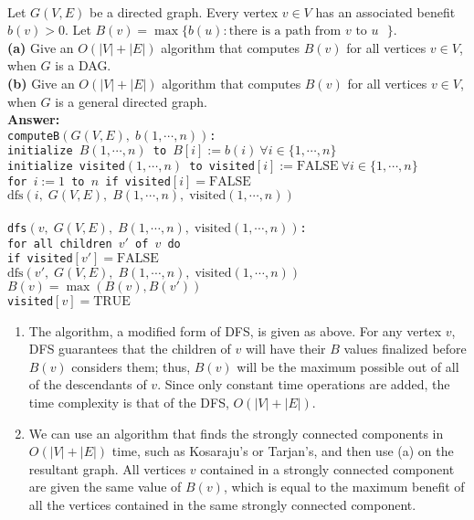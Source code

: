 \documentclass[a4paper,11pt]{article}
\begin{document}
\bigskip

\\
Let $G(V,E)$ be a directed graph. Every vertex $v\in V$  has an associated benefit $b(v) > 0$.
Let $B(v) = \max \{  b(u): \mbox{there is a path from $v$ to $u$ }    \}$. \\
{\bf (a)} Give an $O(|V|+|E|)$ algorithm that computes $B(v)$ for all vertices $v\in V$, when $G$ is a DAG.\\
{\bf (b)} Give an $O(|V|+|E|)$ algorithm that computes $B(v)$  for all vertices $v\in V$, when $G$ is a general directed graph.\\
{\bf Answer:} \\
\texttt{computeB$(G(V, E), \; b(1, \cdots, n))$: \\
\indent initialize $B(1, \cdots, n)$ to $B[i] := b(i)\ \forall i \in \{ 1, \cdots, n \}$ \\
\indent initialize visited$(1, \cdots, n)$ to visited$[i] := \text{FALSE}\ \forall i \in \{ 1, \cdots, n \}$ \\
\indent for $i := 1$ to $n$ if visited$[i] = \text{FALSE}$ \\
\indent \indent $\text{dfs}(i,\; G(V, E),\; B(1, \cdots, n),\; \text{visited}(1, \cdots, n))$ \\
} \\
\texttt{dfs$(v,\; G(V, E), \; B(1, \cdots, n), \; \text{visited}(1, \cdots, n))$: \\
\indent for all children $v'$ of $v$ do \\
\indent \indent if visited$[v'] = \text{FALSE}$ \\
\indent \indent \indent $\text{dfs}(v',\; G(V, E),\; B(1, \cdots, n),\; \text{visited}(1, \cdots, n))$ \\
\indent \indent $B(v) = \max(B(v), B(v'))$ \\
\indent visited$[v] = \text{TRUE}$
}
\begin{enumerate}[label=(\alph*)]
    \item
        The algorithm, a modified form of DFS, is given as above. For any vertex $v$, DFS guarantees that the children of $v$ will have their $B$ values finalized before $B(v)$ considers them; thus, $B(v)$ will be the maximum possible out of all of the descendants of $v$. Since only constant time operations are added, the time complexity is that of the DFS, $O(|V| + |E|)$.

    \item
        We can use an algorithm that finds the strongly connected components in $O(|V| + |E|)$ time, such as Kosaraju's or Tarjan's, and then use (a) on the resultant graph. All vertices $v$ contained in a strongly connected component are given the same value of $B(v)$, which is equal to the maximum benefit of all the vertices contained in the same strongly connected component.
\end{enumerate}
\end{document}
